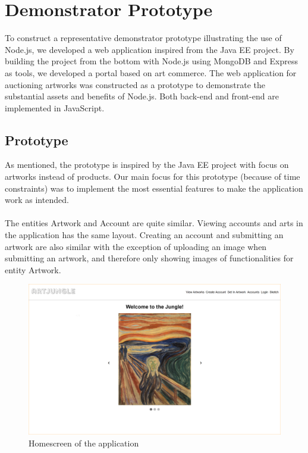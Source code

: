 \section{Demonstrator Prototype}
\label{sec:prototype}

To construct a representative demonstrator prototype illustrating the use of Node.js, we developed a web application inspired from the Java EE project. By building the project from the bottom with Node.js using MongoDB and Express as tools, we developed a portal based on art commerce. The web application for auctioning artworks was constructed as a prototype to demonstrate the substantial assets and benefits of Node.js. Both back-end and front-end are implemented in JavaScript. 

\subsection{Prototype}
As mentioned, the prototype is inspired by the Java EE project with focus on artworks instead of products. Our main focus for this prototype (because of time constraints) was to implement the most essential features to make the application work as intended.
\\\\
The entities Artwork and Account are quite similar. Viewing accounts and arts in the application has the same layout. Creating an account and submitting an artwork are also similar with the exception of uploading an image when submitting an artwork, and therefore only showing images of functionalities for entity Artwork.

\begin{figure}[h!]
  \centering
  \includegraphics[scale=0.3]{figs/homescreen.png}
  \caption{Homescreen of the application}
\end{figure}

